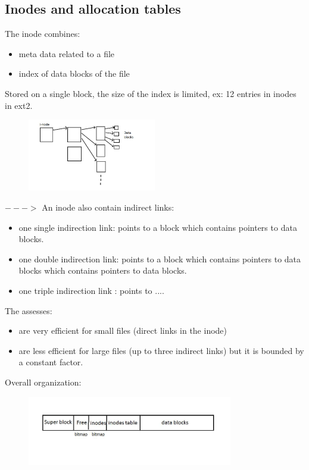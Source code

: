 \subsection{Inodes and allocation tables}

The inode combines:
\begin{itemize}
  \item meta data related to a file
  \item index of data blocks of the file
\end{itemize}

Stored on a single block, the size of the index is limited, ex: 12 entries in inodes in ext2.

\begin{figure}[h!]
  \begin{center}
    \includegraphics[width=0.5\textwidth]{inode.jpg}
  \end{center}
\end{figure}

$--->$ An inode also contain indirect links:
\begin{itemize}
  \item one single indirection link: points to a block which contains pointers to data blocks.

  \item one double indirection link: points to a block which contains pointers to data blocks which contains pointers to data blocks.
  \item one triple indirection link : points to ....
  
\end{itemize}

The assesses:
\begin{itemize}
  \item are very efficient for small files (direct links in the inode)
  \item are less efficient for large files (up to three indirect links) but it is bounded by a constant factor.
\end{itemize}

Overall organization:

 \begin{figure}[h!]
  \begin{center}
    \includegraphics[width=0.8\textwidth]{inode_2.jpg}
  \end{center}
\end{figure}


